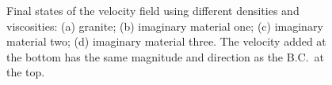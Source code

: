 \documentclass[11pt]{article}
\numberwithin{figure}{section}  %
\numberwithin{equation}{section}  %
\begin{document}
\begin{multicols}{2}
\begin{figure}[!htb]
	\centering
	\caption{Final states of the velocity field using different densities and viscosities: (a) granite; (b) imaginary material one; (c) imaginary material two; (d) imaginary material three. The velocity added at the bottom has the same magnitude and direction as the B.C.\ at the top.}
	\label{fig:vortexone}
\end{figure}


\end{multicols}
\end{document}
